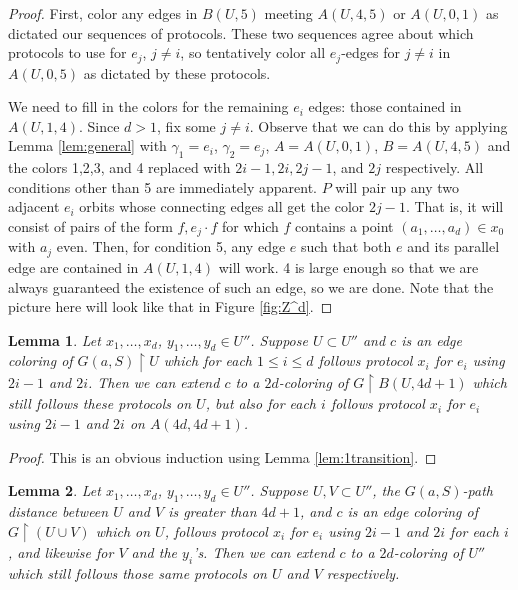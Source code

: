 \documentclass[10pt,a4paper]{article}
\newcommand{\0}{\varnothing}
\newcommand{\res}{\upharpoonright}
\newtheorem{lemma}{Lemma}
\begin{document}
\begin{proof}
First, color any edges in $B(U,5)$ meeting $A(U,4,5)$ or $A(U,0,1)$ as dictated our sequences of protocols. These two sequences agree about which protocols to use for $e_j$, $j \neq i$, so tentatively color all $e_j$-edges for $j \neq i$ in $A(U,0,5)$ as dictated by these protocols.

We need to fill in the colors for the remaining $e_i$ edges: those contained in $A(U,1,4)$. Since $d > 1$, fix some $j \neq i$. Observe that we can do this by applying Lemma \ref{lem:general} with $\gamma_1 = e_i$, $\gamma_2 = e_j$, $A = A(U,0,1)$, $B = A(U,4,5)$ and the colors 1,2,3, and 4 replaced with $2i-1,2i,2j-1$, and $2j$ respectively. All conditions other than 5 are immediately apparent. $P$ will pair up any two adjacent $e_i$ orbits whose connecting edges all get the color $2j-1$. That is, it will consist of pairs of the form $f,e_j \cdot f$ for which $f$ contains a point $(a_1,\ldots,a_d) \in x_0$ with $a_j$ even. Then, for condition 5, any edge $e$ such that both $e$ and its parallel edge are contained in $A(U,1,4)$ will work. 4 is large enough so that we are always guaranteed the existence of such an edge, so we are done. Note that the picture here will look like that in Figure \ref{fig:Z^d}.
\end{proof}

\begin{lemma}\label{lem:fulltransition}
Let $x_1,\ldots,x_d$, $y_1,\ldots,y_d \in U''$. Suppose $U \subset U''$ and $c$ is an edge coloring of $G(a,S) \res U$ which for each $1 \leq i \leq d$ follows protocol $x_i$ for $e_i$ using $2i - 1$ and $2i$. Then we can extend $c$ to a $2d$-coloring of $G \res B(U,4d+1)$ which still follows these protocols on $U$, but also for each $i$ follows protocol $x_i$ for $e_i$ using $2i - 1$ and $2i$ on $A(4d,4d+1)$.
\end{lemma}

\begin{proof}
This is an obvious induction using Lemma \ref{lem:1transition}.
\end{proof}

\begin{lemma}\label{lem:2sets}
Let $x_1,\ldots,x_d$, $y_1,\ldots,y_d \in U''$. Suppose $U,V \subset U''$, the $G(a,S)$-path distance between $U$ and $V$ is greater than $4d+1$, and $c$ is an edge coloring of $G \res (U \cup V)$ which on $U$, follows protocol $x_i$ for $e_i$ using $2i-1$ and $2i$ for each $i$, and likewise for $V$ and the $y_i$'s. Then we can extend $c$ to a $2d$-coloring of $U''$ which still follows those same protocols on $U$ and $V$ respectively.
\end{lemma}
\end{document}
